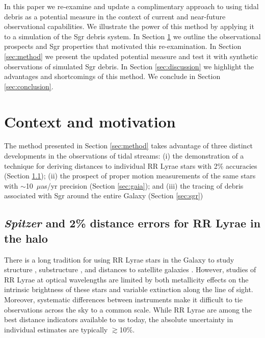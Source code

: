 \documentclass{emulateapj}
\begin{document}
In this paper we re-examine and update a complimentary approach to using tidal debris as a potential measure \citep[originially proposed by][]{johnston99a}  in the context of current and near-future observational capabilities. We illustrate the power of this method by applying it to a simulation of the Sgr debris system.
In Section \ref{sec:context} we outline the observational prospects and Sgr properties that motivated this re-examination.
In Section \ref{sec:method} we present the updated potential measure and test it with synthetic observations of simulated Sgr debris.
In Section \ref{sec:discussion} we highlight the advantages and shortcomings of this method.
We conclude in Section \ref{sec:conclusion}.

%

\section{Context and motivation} \label{sec:context}
The method presented in Section \ref{sec:method} takes advantage of
three distinct developments in the observations of tidal streams: (i)
the demonstration of a technique for deriving distances to individual
RR Lyrae stars with 2\% accuracies (Section \ref{sec:spitzer}); (ii)
the prospect of proper motion measurements of the same stars with
$\sim$10~$\mu$as/yr precision (Section \ref{sec:gaia}); and (iii) the
tracing of debris associated with Sgr around the entire Galaxy
(Section \ref{sec:sgr})

\subsection{{\it Spitzer} and 2\% distance errors for RR Lyrae in the halo}
\label{sec:spitzer}

There is a long tradition for using RR Lyrae stars in the Galaxy to
study structure 
\citep[e.g.][]{shapley18}, substructure
\citep[e.g.][]{sesar10}, and distances to satellite galaxies
\citep[e.g.][]{clementini03}.  However, studies of RR Lyrae at optical
wavelengths are limited by both metallicity effects on the intrinsic
brightness of these stars and variable extinction along the line of
sight.  Moreover, systematic differences between instruments make it
difficult to tie observations across the sky to a common scale. While
RR Lyrae are among the best distance indicators available to us today,
the absolute uncertainty in individual estimates are typically
$\gtrsim$10\%.
\end{document}
